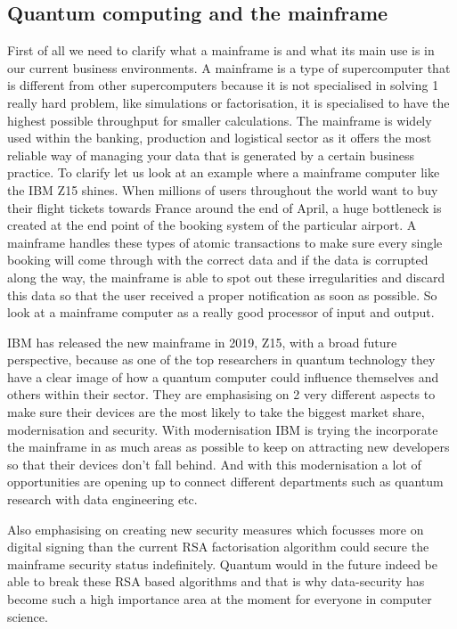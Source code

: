 \subsection{Quantum computing and the mainframe}

First of all we need to clarify what a mainframe is and what its main use is in our current business environments. A mainframe is a type of supercomputer that is different from other supercomputers because it is not specialised in solving 1 really hard problem, like simulations or factorisation, it is specialised to have the highest possible throughput for smaller calculations. The mainframe is widely used within the banking, production and logistical sector as it offers the most reliable way of managing your data that is generated by a certain business practice. To clarify let us look at an example where a mainframe computer like the IBM Z15 shines. When millions of users throughout the world want to buy their flight tickets towards France around the end of April, a huge bottleneck is created at the end point of the booking system of the particular airport. A mainframe handles these types of atomic transactions to make sure every single booking will come through with the correct data and if the data is corrupted along the way, the mainframe is able to spot out these irregularities and discard this data so that the user received a proper notification as soon as possible. So look at a mainframe computer as a really good processor of input and output.

IBM has released the new mainframe in 2019, Z15, with a broad future perspective, because as one of the top researchers in quantum technology they have a clear image of how a quantum computer could influence themselves and others within their sector.
They are emphasising on 2 very different aspects to make sure their devices are the most likely to take the biggest market share, modernisation and security. 
With modernisation IBM is trying the incorporate the mainframe in as much areas as possible to keep on attracting new developers so that their devices don't fall behind. And with this modernisation a lot of opportunities are opening up to connect different departments such as quantum research with data engineering etc. 

Also emphasising on creating new security measures which focusses more on digital signing than the current RSA factorisation algorithm could secure the mainframe security status indefinitely. Quantum would in the future indeed be able to break these RSA based algorithms and that is why data-security has become such a high importance area at the moment for everyone in computer science.

